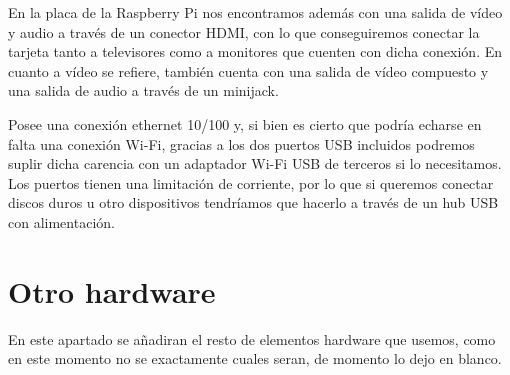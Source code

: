 En la placa de la Raspberry Pi nos encontramos además con una salida de vídeo y audio a través de un conector HDMI, con lo que conseguiremos conectar la tarjeta tanto a televisores como a monitores que cuenten con dicha conexión. En cuanto a vídeo se refiere, también cuenta con una salida de vídeo compuesto y una salida de audio a través de un minijack.



Posee una conexión ethernet 10/100 y, si bien es cierto que podría echarse en falta una conexión Wi-Fi, gracias a los dos puertos USB incluidos podremos suplir dicha carencia con un adaptador Wi-Fi USB de terceros si lo necesitamos. Los puertos tienen una limitación de corriente, por lo que si queremos conectar discos duros u otro dispositivos tendríamos que hacerlo a través de un hub USB con alimentación.



\section{Otro hardware}
En este apartado se añadiran el resto de elementos hardware que usemos, como en este momento no se exactamente cuales seran, de momento lo dejo en blanco.
